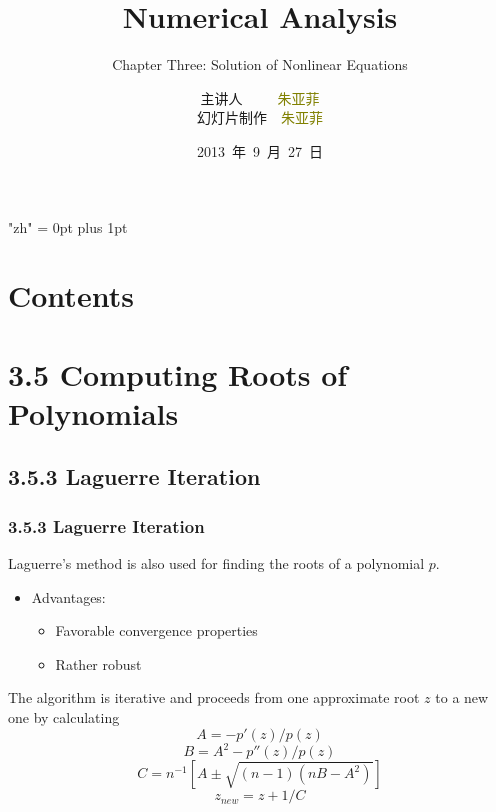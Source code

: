 \documentclass[notheorems,mathserif,table,compress]{beamer}  %
\begin{document}
\XeTeXlinebreaklocale "zh"         %
\XeTeXlinebreakskip = 0pt plus 1pt %


\title[Numerical Analysis]{Numerical Analysis}
\subtitle{Chapter Three: Solution of Nonlinear Equations}
\author[zhu]{主讲人~~~~~\textcolor{olive}{朱亚菲}\\
    \quad 幻灯片制作~~\textcolor{olive}{朱亚菲}}
\institute[中国海洋大学]{\small\textcolor{violet}{中国海洋大学~~信息科学与工程学院}}
\date{2013~年~9~月~27~日}
\frame{ \titlepage }
\section*{Contents}



\section{3.5 Computing Roots of Polynomials}

\subsection{3.5.3 Laguerre Iteration}

\begin{frame}
  \frametitle{3.5.3 Laguerre Iteration}
  Laguerre's method is also used for finding the roots of a polynomial $p$.
  \begin{itemize}
  \item Advantages:
  \begin{itemize}
  \item Favorable convergence properties
  \item Rather robust
  \end{itemize}
  \end{itemize}
  The algorithm is iterative and proceeds from one approximate root $z$ to a new one by calculating
  \[ A=-p'(z)/p(z) \]
  \[ B=A^2-p''(z)/p(z) \]
  \[ C=n^{-1}[A\pm \sqrt{(n-1)(nB-A^2)}] \]
  \[z_{new} =z+1/C \]
\end{frame}
\end{document}
